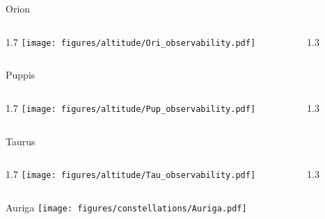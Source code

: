\documentclass[final]{beamer}
\newlength{\colwidth}
\begin{document}
\begin{frame}[t]{}

  \Large{Orion}
  \begin{columns}[T]
    \begin{column}{1.7\colwidth}
      \centering
      \texttt{[image: figures/altitude/Ori\_observability.pdf]}
    \end{column}
    \begin{column}{1.3\colwidth}
      \Large
      
    \end{column}
  \end{columns}

  \Large{Puppis}
  \begin{columns}[T]
    \begin{column}{1.7\colwidth}
      \centering
      \texttt{[image: figures/altitude/Pup\_observability.pdf]}
    \end{column}
    \begin{column}{1.3\colwidth}
      \Large
      
    \end{column}
  \end{columns}

  \Large{Taurus}
  \begin{columns}[T]
    \begin{column}{1.7\colwidth}
      \centering
      \texttt{[image: figures/altitude/Tau\_observability.pdf]}
    \end{column}
    \begin{column}{1.3\colwidth}
      \Large
      
    \end{column}
  \end{columns}
\end{frame}


\begin{frame}[t]{\LARGE Auriga}
  \centering
  \texttt{[image: figures/constellations/Auriga.pdf]}
\end{frame}

\end{document}
